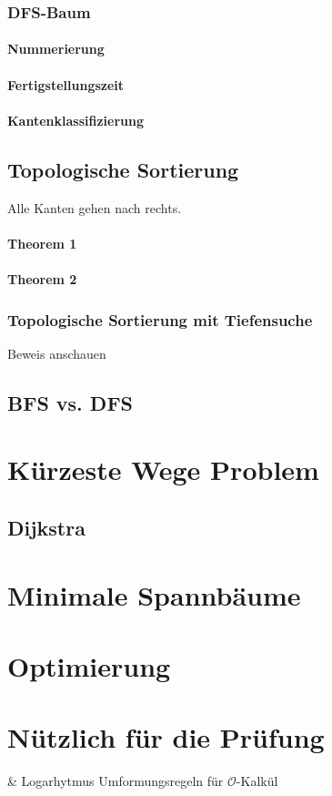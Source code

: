 \documentclass[a4paper]{scrartcl}
\begin{document}
			\subsubsection{DFS-Baum}
			\paragraph{Nummerierung}
			\paragraph{Fertigstellungszeit}
			\paragraph{Kantenklassifizierung}
			
			\subsection{Topologische Sortierung}
			Alle Kanten gehen nach rechts.\\
			\paragraph{Theorem 1}
			\paragraph{Theorem 2}
			\subsubsection{Topologische Sortierung mit Tiefensuche}
			Beweis anschauen\\
		
		\subsection{BFS vs. DFS}
		
	\section{Kürzeste Wege Problem}
		\subsection{Dijkstra}
		
	
	\section{Minimale Spannbäume}
	\section[Noch mehr Entwurfsmethoden]{Optimierung}
	\section{Nützlich für die Prüfung}
		\begin{easylist}
			& Logarhytmus Umformungsregeln für \(\mathcal{O}\)-Kalkül
		\end{easylist}
\end{document}

